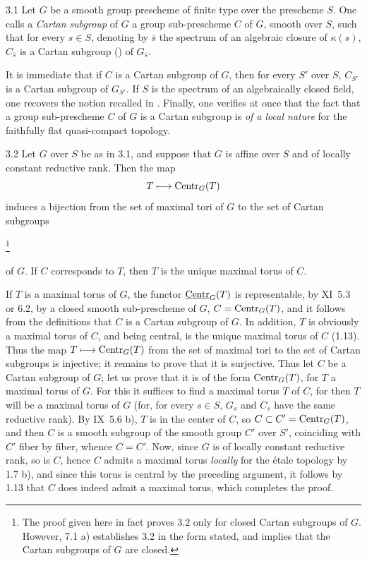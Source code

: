 \begin{definition}{3.1}\label{XII.3.1}
Let $G$ be a smooth group prescheme of finite type over the prescheme $S$. One calls a \emph{Cartan subgroup} of $G$ a group sub-prescheme $C$ of $G$, smooth over $S$, such that for every $s\in S$, denoting by $\overline s$ the spectrum of an algebraic closure of $\kappa(s)$, $C_{\overline s}$ is a Cartan subgroup (\cf {}) of $G_{\overline s}$.
\end{definition}
It is immediate that if $C$ is a Cartan subgroup of $G$, then for every $S'$ over $S$, $C_{S'}$ is a Cartan subgroup of $G_{S'}$. If $S$ is the spectrum of an algebraically closed field, one recovers the notion recalled in . Finally, one verifies at once that the fact that a group sub-prescheme $C$ of $G$ is a Cartan subgroup is \emph{of a local nature} for the faithfully flat quasi-compact topology.
\begin{theorem}{3.2}\label{XII.3.2}
Let $G$ over $S$ be as in 3.1, and suppose that $G$ is affine over $S$ and of locally constant reductive rank. Then the map
\[
T\longmapsto\operatorname{Centr}_G(T)
\]
induces a bijection from the set of maximal tori of $G$ to the set of Cartan subgroups{\renewcommand{\thefootnote}{*}\footnote{The proof given here in fact proves 3.2 only for closed Cartan subgroups of $G$. However, 7.1 a) establishes 3.2 in the form stated, and implies that the Cartan subgroups of $G$ are closed.}\addtocounter{footnote}{-1}} of $G$. If $C$ corresponds to $T$, then $T$ is the unique maximal torus of $C$.
\end{theorem}
If $T$ is a maximal torus of $G$, the functor $\underline{\mathrm{Centr}}_G(T)$ is representable, by XI~5.3 or 6.2, by a closed smooth sub-prescheme of $G$, $C=\operatorname{Centr}_G(T)$, and it follows from the definitions that $C$ is a Cartan subgroup of $G$. In addition, $T$ is obviously a maximal torus of $C$, and being central, is the unique maximal torus of $C$ (1.13). Thus the map $T\longmapsto\operatorname{Centr}_G(T)$ from the set of maximal tori to the set of Cartan subgroups is injective; it remains to prove that it is surjective. Thus let $C$ be a Cartan subgroup of $G$; let us prove that it is of the form $\operatorname{Centr}_G(T)$, for $T$ a maximal torus of $G$. For this it suffices to find a maximal torus $T$ of $C$, for then $T$ will be a maximal torus of $G$ (for, for every $s\in S$, $G_s$ and $C_s$ have the same reductive rank). By IX~5.6 b), $T$ is in the center of $C$, so $C\subset C'=\operatorname{Centr}_G(T)$, and then $C$ is a smooth subgroup of the smooth group $C'$ over $S'$, coinciding with $C'$ fiber by fiber, whence $C=C'$. Now, since $G$ is of locally constant reductive rank, so is $C$, hence $C$ admits a maximal torus \emph{locally} for the étale topology by 1.7 b), and since this torus is central by the preceding argument, it follows by 1.13 that $C$ does indeed admit a maximal torus, which completes the proof.
